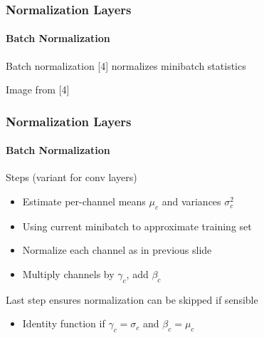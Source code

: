 \documentclass[xetex,professionalfont]{beamer}
\renewcommand\emph[1]{\textcolor{tuwcvl_cvl_blue}{#1}}
\begin{document}
  
  \begin{frame}
    \frametitle{Normalization Layers}
  \framesubtitle{Batch Normalization}
  
  \emph{Batch normalization} [4] normalizes minibatch statistics
  
  \medskip
  
  \begin{center}
      {\centering Image from [4]}
  \end{center}
  
  \end{frame}
  
  
  \begin{frame}
    \frametitle{Normalization Layers}
  \framesubtitle{Batch Normalization}
  
  Steps (variant for conv layers)
  \begin{itemize}
      \item Estimate per-channel means $\mu_c$ and variances $\sigma^2_c$
      \item Using current minibatch to approximate training set
      \item Normalize each channel as in previous slide
      \item Multiply channels by $\gamma_c$, add $\beta_c$
  \end{itemize}
  
  \bigskip
  
  Last step ensures normalization can be skipped if sensible
  \begin{itemize}
      \item Identity function if $\gamma_c=\sigma_c$ and $\beta_c=\mu_c$ %
  \end{itemize}
  
  \end{frame}
  
\end{document}
